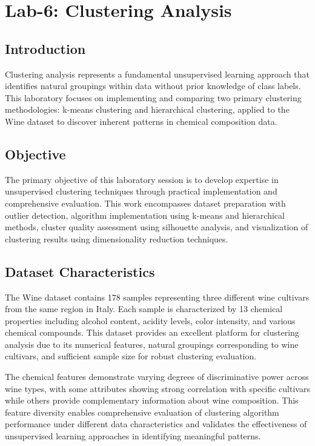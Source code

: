 \documentclass[12pt,a4paper]{article}
\begin{document}
\newpage

\section{Lab-6: Clustering Analysis}

\subsection{Introduction}
Clustering analysis represents a fundamental unsupervised learning approach that identifies natural groupings within data without prior knowledge of class labels. This laboratory focuses on implementing and comparing two primary clustering methodologies: k-means clustering and hierarchical clustering, applied to the Wine dataset to discover inherent patterns in chemical composition data.

\subsection{Objective}
The primary objective of this laboratory session is to develop expertise in unsupervised clustering techniques through practical implementation and comprehensive evaluation. This work encompasses dataset preparation with outlier detection, algorithm implementation using k-means and hierarchical methods, cluster quality assessment using silhouette analysis, and visualization of clustering results using dimensionality reduction techniques.

\subsection{Dataset Characteristics}
The Wine dataset contains 178 samples representing three different wine cultivars from the same region in Italy. Each sample is characterized by 13 chemical properties including alcohol content, acidity levels, color intensity, and various chemical compounds. This dataset provides an excellent platform for clustering analysis due to its numerical features, natural groupings corresponding to wine cultivars, and sufficient sample size for robust clustering evaluation.

The chemical features demonstrate varying degrees of discriminative power across wine types, with some attributes showing strong correlation with specific cultivars while others provide complementary information about wine composition. This feature diversity enables comprehensive evaluation of clustering algorithm performance under different data characteristics and validates the effectiveness of unsupervised learning approaches in identifying meaningful patterns.
\end{document}
